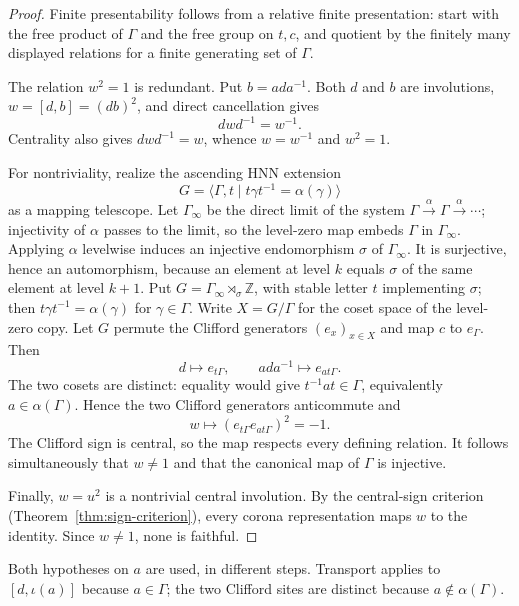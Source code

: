 \documentclass[11pt]{amsart}
\theoremstyle{definition}
\theoremstyle{remark}
\theoremstyle{plain}
\newcommand{\Z}{\mathbb Z}
\begin{document}
\begin{proof}
Finite presentability follows from a relative finite presentation: start with
the free product of $\Gamma$ and the free group on $t,c$, and quotient by the
finitely many displayed relations for a finite generating set of $\Gamma$.

The relation $w^2=1$ is redundant.  Put $b=ada^{-1}$.  Both $d$ and $b$ are
involutions, $w=[d,b]=(db)^2$, and direct cancellation gives
\begin{equation}\label{eq:involution-reversal}
 dwd^{-1}=w^{-1}.
\end{equation}
Centrality also gives $dwd^{-1}=w$, whence $w=w^{-1}$ and $w^2=1$.

For nontriviality, realize the ascending HNN extension
\[
 G=\langle\Gamma,t\mid t\gamma t^{-1}=\alpha(\gamma)\rangle
\]
as a mapping telescope.  Let $\Gamma_\infty$ be the direct limit of the
system $\Gamma\xrightarrow{\alpha}\Gamma\xrightarrow{\alpha}\cdots$;
injectivity of $\alpha$ passes to the limit, so the level-zero map embeds
$\Gamma$ in $\Gamma_\infty$.  Applying $\alpha$ levelwise induces an
injective endomorphism $\sigma$ of $\Gamma_\infty$.  It is surjective,
hence an automorphism, because an element at level $k$ equals $\sigma$
of the same element at level $k+1$.  Put
$G=\Gamma_\infty\rtimes_\sigma\Z$, with stable letter $t$ implementing
$\sigma$; then $t\gamma t^{-1}=\alpha(\gamma)$ for $\gamma\in\Gamma$.
Write $X=G/\Gamma$ for the coset space of the level-zero copy.  Let
$G$ permute the Clifford generators $(e_x)_{x\in X}$ and map $c$ to
$e_\Gamma$.  Then
\[
 d\longmapsto e_{t\Gamma},\qquad
 ada^{-1}\longmapsto e_{at\Gamma}.
\]
The two cosets are distinct: equality would give
$t^{-1}at\in\Gamma$, equivalently $a\in\alpha(\Gamma)$.  Hence the two
Clifford generators anticommute and
\[
 w\longmapsto(e_{t\Gamma}e_{at\Gamma})^2=-1.
\]
The Clifford sign is central, so the map respects every defining relation.
It follows simultaneously that $w\ne1$ and that the canonical map of
$\Gamma$ is injective.

Finally, $w=u^2$ is a nontrivial central involution.  By the
central-sign criterion (Theorem~\ref{thm:sign-criterion}), every
corona representation maps $w$ to the identity.  Since $w\ne1$, none
is faithful.
\end{proof}

Both hypotheses on $a$ are used, in different steps.  Transport
applies to $[d,\iota(a)]$ because $a\in\Gamma$; the two Clifford sites
are distinct because $a\notin\alpha(\Gamma)$.
\end{document}
